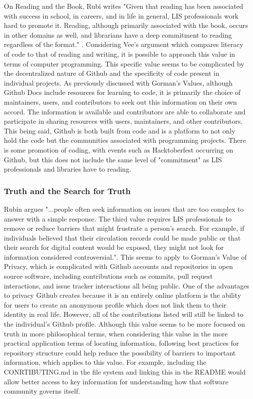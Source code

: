 On Reading and the Book, Rubi writes "Given that reading has been associated with success in school, in careers, and in life in general, LIS professionals work hard to promote it. Reading, although primarily associated with the book, occurs in other domains as well, and librarians have a deep commitment to reading regardless of the format." \cite{rubin2016foundationslis}. Considering Vee's argument which compares literacy of code to that of reading and writing, it is possible to approach this value in terms of computer programming\cite{vee2017coding}. This specific value seems to be complicated by the decentralized nature of Github and the specificity of code present in individual projects. As previously discussed with Gorman's Values, although Github Docs include resources for learning to code, it is primarily the choice of maintainers, users, and contributors to seek out this information on their own accord. The information is available and contributors are able to collaborate and participate in sharing resources with users, maintainers, and other contributors. This being said, Github is both built from code and is a platform to not only hold the code but the communities associated with programming projects. There is some promotion of coding, with events such as Hacktoberfest occurring on Github, but this does not include the same level of "commitment" as LIS professionals and libraries have to reading.


\subsubsection{Truth and the Search for Truth}

Rubin argues "...people often seek information on issues that are too complex to answer with a simple response. The third value requires LIS professionals to remove or reduce barriers that might frustrate a person’s search. For example, if individuals believed that their circulation records could be made public or that their search for digital content would be exposed, they might not look for information considered controversial."\cite{rubin2016foundationslis}. This seems to apply to Gorman's Value of Privacy, which is complicated with Github accounts and repositories in open source software, including contributions such as commits, pull request interactions, and issue tracker interactions all being public. One of the advantages to privacy Github creates because it is an entirely online platform is the ability for users to create an anonymous profile which does not link them to their identity in real life. However, all of the contributions listed will still be linked to the individual's Github profile. Although this value seems to be more focused on truth in more philosophical terms, when considering this value in the more practical application terms of locating information, following best practices for repository structure could help reduce the possibility of barriers to important information, which applies to this value. For example, including the CONRTIBUTING.md in the file system and linking this in the README would allow better access to key information for understanding how that software community governs itself.

